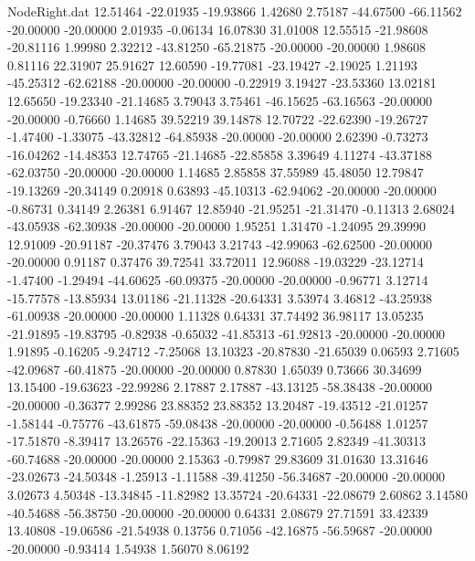 \begin{filecontents}{NodeRight.dat}
  12.51464  -22.01935  -19.93866     1.42680    2.75187  -44.67500  -66.11562  -20.00000  -20.00000    2.01935   -0.06134   16.07830   31.01008
  12.55515  -21.98608  -20.81116     1.99980    2.32212  -43.81250  -65.21875  -20.00000  -20.00000    1.98608    0.81116   22.31907   25.91627
  12.60590  -19.77081  -23.19427    -2.19025    1.21193  -45.25312  -62.62188  -20.00000  -20.00000   -0.22919    3.19427  -23.53360   13.02181
  12.65650  -19.23340  -21.14685     3.79043    3.75461  -46.15625  -63.16563  -20.00000  -20.00000   -0.76660    1.14685   39.52219   39.14878
  12.70722  -22.62390  -19.26727    -1.47400   -1.33075  -43.32812  -64.85938  -20.00000  -20.00000    2.62390   -0.73273  -16.04262  -14.48353
  12.74765  -21.14685  -22.85858     3.39649    4.11274  -43.37188  -62.03750  -20.00000  -20.00000    1.14685    2.85858   37.55989   45.48050
  12.79847  -19.13269  -20.34149     0.20918    0.63893  -45.10313  -62.94062  -20.00000  -20.00000   -0.86731    0.34149    2.26381    6.91467
  12.85940  -21.95251  -21.31470    -0.11313    2.68024  -43.05938  -62.30938  -20.00000  -20.00000    1.95251    1.31470   -1.24095   29.39990
  12.91009  -20.91187  -20.37476     3.79043    3.21743  -42.99063  -62.62500  -20.00000  -20.00000    0.91187    0.37476   39.72541   33.72011
  12.96088  -19.03229  -23.12714    -1.47400   -1.29494  -44.60625  -60.09375  -20.00000  -20.00000   -0.96771    3.12714  -15.77578  -13.85934
  13.01186  -21.11328  -20.64331     3.53974    3.46812  -43.25938  -61.00938  -20.00000  -20.00000    1.11328    0.64331   37.74492   36.98117
  13.05235  -21.91895  -19.83795    -0.82938   -0.65032  -41.85313  -61.92813  -20.00000  -20.00000    1.91895   -0.16205   -9.24712   -7.25068
  13.10323  -20.87830  -21.65039     0.06593    2.71605  -42.09687  -60.41875  -20.00000  -20.00000    0.87830    1.65039    0.73666   30.34699
  13.15400  -19.63623  -22.99286     2.17887    2.17887  -43.13125  -58.38438  -20.00000  -20.00000   -0.36377    2.99286   23.88352   23.88352
  13.20487  -19.43512  -21.01257    -1.58144   -0.75776  -43.61875  -59.08438  -20.00000  -20.00000   -0.56488    1.01257  -17.51870   -8.39417
  13.26576  -22.15363  -19.20013     2.71605    2.82349  -41.30313  -60.74688  -20.00000  -20.00000    2.15363   -0.79987   29.83609   31.01630
  13.31646  -23.02673  -24.50348    -1.25913   -1.11588  -39.41250  -56.34687  -20.00000  -20.00000    3.02673    4.50348  -13.34845  -11.82982
  13.35724  -20.64331  -22.08679     2.60862    3.14580  -40.54688  -56.38750  -20.00000  -20.00000    0.64331    2.08679   27.71591   33.42339
  13.40808  -19.06586  -21.54938     0.13756    0.71056  -42.16875  -56.59687  -20.00000  -20.00000   -0.93414    1.54938    1.56070    8.06192

\end{filecontents}
